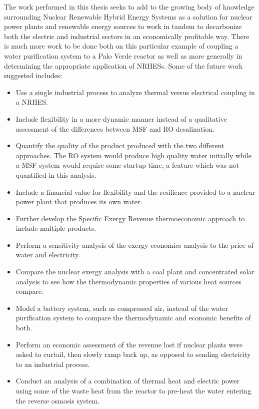 
The work performed in this thesis seeks to add to the growing body of knowledge surrounding Nuclear Renewable Hybrid Energy Systems as a solution for nuclear power plants and renewable energy sources to work in tandem to decarbonize both the electric and industrial sectors in an economically profitable way. There is much more work to be done both on this particular example of coupling a water purification system to a Palo Verde reactor as well as more generally in determining the appropriate application of NRHESs. Some of the future work suggested includes:

\begin{itemize}
\item Use a single industrial process to analyze thermal versus electrical coupling in a NRHES.
\item Include flexibility in a more dynamic manner instead of a qualitative assessment of the differences between MSF and RO desalination.
\item Quantify the quality of the product produced with the two different approaches.  The RO system would produce high quality water initially while a MSF system would require some startup time, a feature which was not quantified in this analysis.
\item Include a financial value for flexibility and the resilience provided to a nuclear power plant that produces its own water.
\item Further develop the Specific Exergy Revenue thermoeconomic approach to include multiple products.
\item Perform a sensitivity analysis of the exergy economics analysis to the price of water and electricity.
\item Compare the nuclear exergy analysis with a coal plant and concentrated solar analysis to see how the thermodynamic properties of various heat sources compare.
\item Model a battery system, such as compressed air, instead of the water purification system to compare the thermodynamic and economic benefits of both.
\item Perform an economic assessment of the revenue lost if nuclear plants were asked to curtail, then slowly ramp back up, as opposed to sending electricity to an industrial process.
\item Conduct an analysis of a combination of thermal heat and electric power using some of the waste heat from the reactor to pre-heat the water entering the reverse osmosis system.

\end{itemize}
